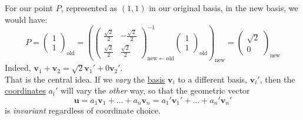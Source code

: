 	For our point $P$, represented as $(1,1)$ in our original basis, in the new basis, we would have:
	\begin{equation*}
		P = \begin{pmatrix}
			1 \\ 1
		\end{pmatrix}_{\mathrm{old}}
		= \left( \begin{pmatrix}
			 \frac{\sqrt 2}{2} &  -\frac{\sqrt 2}{2} \\
			 \frac{\sqrt 2}{2} &  \frac{\sqrt 2}{2}
		\end{pmatrix}^{-1}_{\mathrm{new} \leftarrow \mathrm{old}} 		\begin{pmatrix}
			1 \\ 1
		\end{pmatrix}_{\mathrm{old}}\right)_\mathrm{new}
		= \begin{pmatrix}
			\sqrt 2 \\ 0
		\end{pmatrix}_{\mathrm{new}}
	\end{equation*}
	Indeed, $\mathbf v_1 + \mathbf v_2 = \sqrt 2 \mathbf v_1' + 0 \mathbf v_2'$.\\
	
	That is the central idea. If we \emph{vary} the \underline{basis} $\mathbf v_i$ to a different basis, $\mathbf v_i'$, then the \underline{coordinates} $a_i'$ will vary  the \emph{other} way, so that the geometric vector
	\begin{equation*}
		\mathbf u = a_1 \mathbf v_1 + \dots + a_n \mathbf v_n = a_1' \mathbf v_1' + \dots + a_n' \mathbf v_n'
	\end{equation*} is \emph{invariant} regardless of coordinate choice.
	
